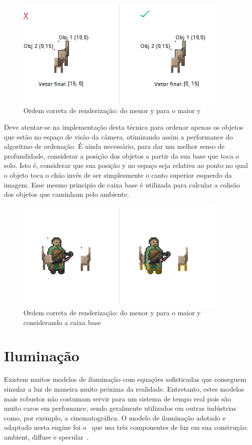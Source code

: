 \documentclass[12pt, 
openright, 
oneside, 
a4paper,    
brazil]{facom-ufu-abntex2}
\begin{document}
\begin{figure}[H]
	\centering
	\includegraphics[width=28em]{imagens/z-order.png}
	\caption{Ordem correta de renderização: do menor y para o maior y}
\end{figure}

Deve atentar-se na implementação desta técnica para ordenar apenas os objetos que estão no espaço de visão da câmera, otimizando assim a performance do algoritmo de ordenação. É ainda necessário, para dar um melhor senso de profundidade, considerar a posição dos objetos a partir da sua base que toca o solo. Isto é, considerar que sua posição y no espaço seja relativa ao ponto no qual o objeto toca o chão invés de ser simplesmente o canto superior esquerdo da imagem. Esse mesmo principio de caixa base é utilizada para calcular a colisão dos objetos que caminham pelo ambiente.


\begin{figure}[H]
	\centering
	\includegraphics[width=28em]{imagens/zOrderWithBaseBox.png}
	\caption{Ordem correta de renderização: do menor y para o maior y considerando a caixa base}
\end{figure}



\section{Iluminação}
Existem muitos modelos de iluminação com equações sofisticadas que conseguem simular a luz de maneira muito próxima da realidade. Entretanto, estes modelos mais robustos não costumam servir para um sistema de tempo real pois são muito caros em perfomance, sendo geralmente utilizados em outras indústrias como, por exemplo, a cinematográfica.
O modelo de iluminação adotado e adaptado nesta engine foi o~ que usa três componentes de luz em sua construção: ambient, diffuse e specular~\cite{PhongShading}.
\end{document}

